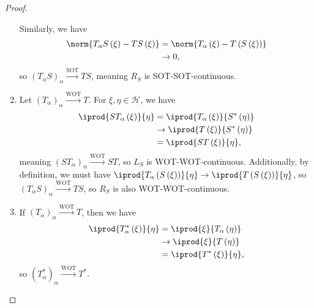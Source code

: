 \documentclass[10pt]{mypackage}
\begin{document}
\begin{proof}
\begin{enumerate}[(1)]
      Similarly, we have
      \begin{align*}
        \norm{T_{\alpha}S\left(\xi\right) - TS\left(\xi\right)} &= \norm{T_{\alpha}\left(\xi\right) - T\left(S\left(\xi\right)\right)}\\
                                                                &\rightarrow 0,
      \end{align*}
      so $\left(T_{\alpha}S\right)_{\alpha}\xrightarrow{\text{SOT}}TS$, meaning $R_{S}$ is SOT-SOT-continuous.
    \item Let $\left(T_{\alpha}\right)_{\alpha}\xrightarrow{\text{WOT}}T$. For $\xi,\eta\in \mathcal{H}$, we have
      \begin{align*}
        \iprod{ST_{\alpha}\left(\xi\right)}{\eta} &= \iprod{T_{\alpha}\left(\xi\right)}{S^{\ast}\left(\eta\right)}\\
                                                  &\rightarrow \iprod{T\left(\xi\right)}{S^{\ast}\left(\eta\right)}\\
                                                  &= \iprod{ST\left(\xi\right)}{\eta},
      \end{align*}
      meaning $\left(ST_{\alpha}\right)_{\alpha}\xrightarrow{\text{WOT}}ST$, so $L_{S}$ is WOT-WOT-continuous. Additionally, by definition, we must have $ \iprod{T_{\alpha}\left(S\left(\xi\right)\right)}{\eta}\rightarrow \iprod{T\left(S\left(\xi\right)\right)}{\eta} $, so $\left(T_{\alpha}S\right)_{\alpha}\xrightarrow{\text{WOT}}TS$, so $R_{S}$ is also WOT-WOT-continuous.
    \item If $\left(T_{\alpha}\right)_{\alpha}\xrightarrow{\text{WOT}}T$, then we have
      \begin{align*}
        \iprod{T^{\ast}_{\alpha}\left(\xi\right)}{\eta} &= \iprod{\xi}{T_{\alpha}\left(\eta\right)}\\
                                                        &\rightarrow \iprod{\xi}{T\left(\eta\right)}\\
                                                        &= \iprod{T^{\ast}\left(\xi\right)}{\eta},
      \end{align*}
      so $\left(T_{\alpha}^{\ast}\right)_{\alpha}\xrightarrow{\text{WOT}} T^{\ast}$.\newline


\end{enumerate}
\end{proof}
\end{document}
